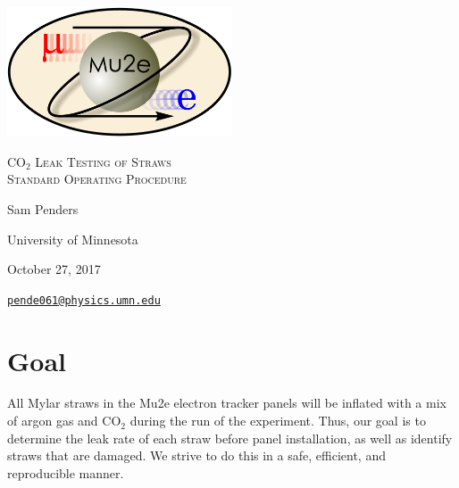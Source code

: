 \documentclass[A4,12pt]{article}
\begin{document}
\begin{titlepage}
	\centering
	\includegraphics[width=0.5\textwidth]{mu2e_logo_oval.png}\par\vspace{2cm}
	{\scshape\LARGE CO$_2$ Leak Testing of Straws \\
		Standard Operating Procedure\par}
	\vspace{3cm}
	{\Large Sam Penders\par}
	\vspace{3cm}
	{\large University of Minnesota\par}
 	\vspace{.5cm}
	{\large October 27, 2017\par}
	\vfill
	{\href{mailto:pende061@physics.umn.edu}{\tt{pende061@physics.umn.edu}}\par}
\end{titlepage}

\clearpage
\setcounter{page}{1}

\newenvironment{myitemize} %
{ \begin{itemize}
    \setlength{\itemsep}{4pt}
    \setlength{\parskip}{0pt}
    \setlength{\parsep}{0pt}     }
{ \end{itemize}                  } 

\section{Goal}
All Mylar straws in the Mu2e electron tracker panels will be inflated with a mix of argon gas and CO$_2$ during the run of the experiment. Thus, our goal is to determine the leak rate of each straw before panel installation, as well as identify straws that are damaged. We strive to do this in a safe, efficient, and reproducible manner.

\end{document}
